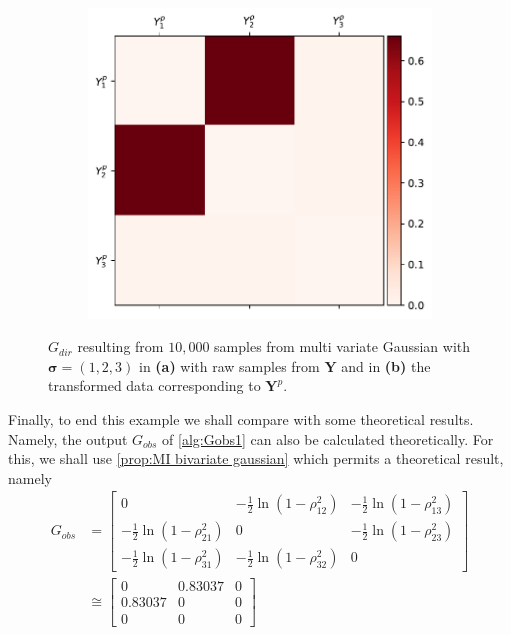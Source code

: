 \documentclass[../Thesis.tex]{subfiles}
\begin{document}
\begin{figure}[H]
\begin{subfigure}[t]{0.49\textwidth}
        \includegraphics[width=\linewidth]{figures/ND examples/Gaussian 3x3 large s power.pdf}
        \caption{}
        \label{fig:Gaussian 3x3 large s power}
    \end{subfigure}
    \caption{$G_{dir}$ resulting from $10{,}000$ samples from multi variate Gaussian with $\boldsymbol\sigma = (1,2,3)$ in \textbf{(a)} with raw samples from $\boldsymbol Y$ and in \textbf{(b)} the transformed data corresponding to $\boldsymbol Y^p$.}
    \label{fig:Gaussian 3x3 large s G_dir differences}
\end{figure}
Finally, to end this example we shall compare with some theoretical results. Namely, the output $G_{obs}$ of \autoref{alg:Gobs1} can also be calculated theoretically. For this, we shall use \autoref{prop:MI bivariate gaussian} which permits a theoretical result, namely
\begin{align*}
    G_{obs} & =
    \begin{bmatrix}
        0                                              & -\frac{1}{2} \ln \left( 1 - \rho_{12}^2\right) & -\frac{1}{2} \ln \left( 1 - \rho_{13}^2\right) \\
        -\frac{1}{2} \ln \left( 1 - \rho_{21}^2\right) & 0                                              & -\frac{1}{2} \ln \left( 1 - \rho_{23}^2\right) \\
        -\frac{1}{2} \ln \left( 1 - \rho_{31}^2\right) & -\frac{1}{2} \ln \left( 1 - \rho_{32}^2\right) & 0
    \end{bmatrix} \\
            & \cong
    \begin{bmatrix}
        0       & 0.83037 & 0 \\
        0.83037 & 0       & 0 \\
        0       & 0       & 0
    \end{bmatrix}
\end{align*}
\end{document}
